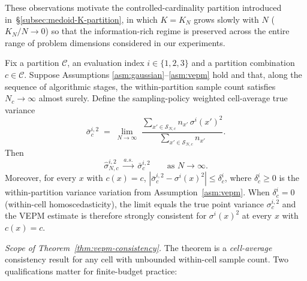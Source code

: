 \begin{remark}
  These observations motivate the controlled-cardinality partition
  introduced in~\S\ref{subsec:medoid-K-partition}, in which $K=K_{N}$
  grows slowly with $N$ ($K_{N}/N\to 0$) so that the information-rich
  regime is preserved across the entire range of problem dimensions
  considered in our experiments.
\end{remark}



\begin{theorem}
  \label{thm:vepm-consistency}
  Fix a partition $\mathcal{C}$, an evaluation index $i\in\{1,2,3\}$ and
  a partition combination $c\in\mathcal{C}$.  Suppose Assumptions
  \ref{asm:gaussian}--\ref{asm:vepm} hold and that, along the sequence of
  algorithmic stages, the within-partition sample count satisfies
  $N_{c}\to\infty$ almost surely.  Define the sampling-policy weighted
  cell-average true variance
  \[
    \bar{\sigma}_{c}^{i,2}
      \;=\;
      \lim_{N\to\infty}\;
      \frac{\sum_{x'\in\mathcal{S}_{N,c}} n_{x'}\, \sigma^{i}(x')^{2}}
           {\sum_{x'\in\mathcal{S}_{N,c}} n_{x'}}.
  \]
  Then
  \[
    \hat{\sigma}_{N,c}^{i,2} \;\xrightarrow{a.s.}\; \bar{\sigma}_{c}^{i,2}
    \qquad\text{as } N\to\infty.
  \]
  Moreover, for every $x$ with $c(x)=c$,
  $|\bar{\sigma}_{c}^{i,2} - \sigma^{i}(x)^{2}| \le \delta_{c}^{i}$,
  where $\delta_{c}^{i}\ge 0$ is the within-partition variance variation
  from Assumption~\ref{asm:vepm}.  When $\delta_{c}^{i}=0$ (within-cell
  homoscedasticity), the limit equals the true point variance
  $\sigma_{c}^{i,2}$ and the VEPM estimate is therefore strongly
  consistent for $\sigma^{i}(x)^{2}$ at every $x$ with $c(x)=c$.
\end{theorem}

\noindent\emph{Scope of Theorem~\ref{thm:vepm-consistency}.}  The
theorem is a \emph{cell-average} consistency result for any cell with
unbounded within-cell sample count.  Two qualifications matter for
finite-budget practice:

